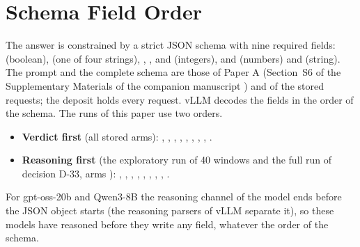 \section{Schema Field Order}
\label{app:schema}

The answer is constrained by a strict JSON schema with nine required fields:  (boolean),  (one of four strings), , ,  and  (integers),  and  (numbers) and  (string). The prompt and the complete schema are those of Paper A (Section~S6 of the Supplementary Materials of the companion manuscript \cite{regan2026rerun}) and of the stored requests; the deposit holds every request. vLLM decodes the fields in the order of the schema. The runs of this paper use two orders.

\begin{itemize}[leftmargin=*,labelsep=5.5mm]
\item \textbf{Verdict first} (all stored arms): , , , , , , , , .
\item \textbf{Reasoning first} (the exploratory run of 40 windows and the full run of decision D-33, arms ): , , , , , , , , .
\end{itemize}

For gpt-oss-20b and Qwen3-8B the reasoning channel of the model ends before the JSON object starts (the reasoning parsers of vLLM separate it), so these models have reasoned before they write any field, whatever the order of the schema.
